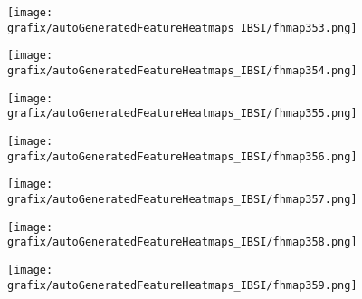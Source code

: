 \hspace{\hsp} 
\begin{subfigure}{\wid\textwidth} 
    \centering 
    \caption{\tiny \sffamily {}} 
    \vspace{\vsp} 
    \texttt{[image: grafix/autoGeneratedFeatureHeatmaps\_IBSI/fhmap353.png]} 
\end{subfigure} 
\hspace{\hsp} 
\begin{subfigure}{\wid\textwidth} 
    \centering 
    \caption{\tiny \sffamily {}} 
    \vspace{\vsp} 
    \texttt{[image: grafix/autoGeneratedFeatureHeatmaps\_IBSI/fhmap354.png]} 
\end{subfigure} 
\hspace{\hsp} 
\begin{subfigure}{\wid\textwidth} 
    \centering 
    \caption{\tiny \sffamily {}} 
    \vspace{\vsp} 
    \texttt{[image: grafix/autoGeneratedFeatureHeatmaps\_IBSI/fhmap355.png]} 
\end{subfigure} 
\hspace{\hsp} 
\begin{subfigure}{\wid\textwidth} 
    \centering 
    \caption{\tiny \sffamily {}} 
    \vspace{\vsp} 
    \texttt{[image: grafix/autoGeneratedFeatureHeatmaps\_IBSI/fhmap356.png]} 
\end{subfigure} 
\hspace{\hsp} 
\begin{subfigure}{\wid\textwidth} 
    \centering 
    \caption{\tiny \sffamily {}} 
    \vspace{\vsp} 
    \texttt{[image: grafix/autoGeneratedFeatureHeatmaps\_IBSI/fhmap357.png]} 
\end{subfigure} 
\hspace{\hsp} 
\begin{subfigure}{\wid\textwidth} 
    \centering 
    \caption{\tiny \sffamily {}} 
    \vspace{\vsp} 
    \texttt{[image: grafix/autoGeneratedFeatureHeatmaps\_IBSI/fhmap358.png]} 
\end{subfigure} 
\hspace{\hsp} 
\begin{subfigure}{\wid\textwidth} 
    \centering 
    \caption{\tiny \sffamily {}} 
    \vspace{\vsp} 
    \texttt{[image: grafix/autoGeneratedFeatureHeatmaps\_IBSI/fhmap359.png]} 
\end{subfigure} 
